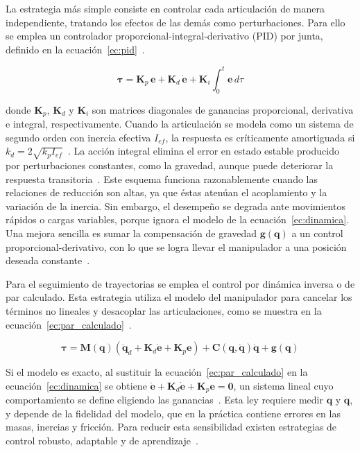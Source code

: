 La estrategia más simple consiste en controlar cada articulación de manera independiente, tratando los efectos de las demás como perturbaciones. Para ello se emplea un controlador proporcional-integral-derivativo (PID) por junta, definido en la ecuación~\ref{ec:pid}~\cite{craig,spong2020}.

\begin{equation}
\label{ec:pid}
    \boldsymbol{\tau} = \mathbf{K}_p\,\mathbf{e} + \mathbf{K}_d\,\dot{\mathbf{e}} + \mathbf{K}_i\int_{0}^{t}\mathbf{e}\,d\tau
\end{equation}

donde $\mathbf{K}_p$, $\mathbf{K}_d$ y $\mathbf{K}_i$ son matrices diagonales de ganancias proporcional, derivativa e integral, respectivamente. Cuando la articulación se modela como un sistema de segundo orden con inercia efectiva $I_{ef}$, la respuesta es críticamente amortiguada si $k_d = 2\sqrt{k_p I_{ef}}$~\cite{craig}. La acción integral elimina el error en estado estable producido por perturbaciones constantes, como la gravedad, aunque puede deteriorar la respuesta transitoria~\cite{craig}. Este esquema funciona razonablemente cuando las relaciones de reducción son altas, ya que éstas atenúan el acoplamiento y la variación de la inercia. Sin embargo, el desempeño se degrada ante movimientos rápidos o cargas variables, porque ignora el modelo de la ecuación~\ref{ec:dinamica}. Una mejora sencilla es sumar la compensación de gravedad $\mathbf{g}(\mathbf{q})$ a un control proporcional-derivativo, con lo que se logra llevar el manipulador a una posición deseada constante~\cite{handbook_motion,spong2020}.

Para el seguimiento de trayectorias se emplea el control por dinámica inversa o de par calculado. Esta estrategia utiliza el modelo del manipulador para cancelar los términos no lineales y desacoplar las articulaciones, como se muestra en la ecuación~\ref{ec:par_calculado}~\cite{craig,handbook_motion}.

\begin{equation}
\label{ec:par_calculado}
    \boldsymbol{\tau} = \mathbf{M}(\mathbf{q})\left(\ddot{\mathbf{q}}_d + \mathbf{K}_d\dot{\mathbf{e}} + \mathbf{K}_p\mathbf{e}\right) + \mathbf{C}(\mathbf{q},\dot{\mathbf{q}})\dot{\mathbf{q}} + \mathbf{g}(\mathbf{q})
\end{equation}

Si el modelo es exacto, al sustituir la ecuación~\ref{ec:par_calculado} en la ecuación~\ref{ec:dinamica} se obtiene $\ddot{\mathbf{e}} + \mathbf{K}_d\dot{\mathbf{e}} + \mathbf{K}_p\mathbf{e} = \mathbf{0}$, un sistema lineal cuyo comportamiento se define eligiendo las ganancias~\cite{craig,handbook_motion}. Esta ley requiere medir $\mathbf{q}$ y $\dot{\mathbf{q}}$, y depende de la fidelidad del modelo, que en la práctica contiene errores en las masas, inercias y fricción. Para reducir esta sensibilidad existen estrategias de control robusto, adaptable y de aprendizaje~\cite{handbook_motion,siciliano2009}.

